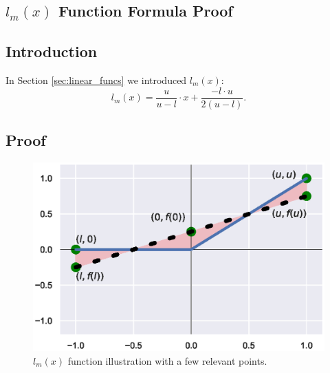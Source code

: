 \documentclass[10pt, conference, twocolumn, compsocconf]{IEEEtran}
\theoremstyle{remark}
\newcommand{\errorMinimizerFunction}{l_m}
\begin{document}
{


}




\newpage
\onecolumn




\begin{appendices}

\section{$\errorMinimizerFunction{}(x)$ Function Formula Proof}
\label{appendix:relax_analysis}

\subsection{Introduction}

In Section \ref{sec:linear_funcs} we introduced $\errorMinimizerFunction{}(x)$:
\[
  \errorMinimizerFunction{}(x) = \frac{u}{u - l} \cdot x
  + \frac{-l\cdot u}{2(u - l)}.
\]

\subsection{Proof}

\begin{figure}[ht]
\begin{center}
\includegraphics[scale=0.7]{figures/relaxed_relax_appendix}
\end{center}
\caption {$\errorMinimizerFunction{}(x)$ function illustration with a few relevant points. \label{fig:relaxed_appendix}}
\end{figure}


\end{appendices}
\end{document}
